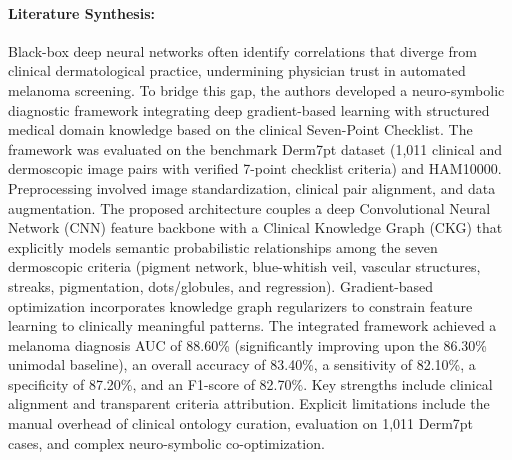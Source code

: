\paragraph{Literature Synthesis:} Black-box deep neural networks often identify correlations that diverge from clinical dermatological practice, undermining physician trust in automated melanoma screening. To bridge this gap, the authors developed a neuro-symbolic diagnostic framework integrating deep gradient-based learning with structured medical domain knowledge based on the clinical Seven-Point Checklist. The framework was evaluated on the benchmark Derm7pt dataset (1,011 clinical and dermoscopic image pairs with verified 7-point checklist criteria) and HAM10000. Preprocessing involved image standardization, clinical pair alignment, and data augmentation. The proposed architecture couples a deep Convolutional Neural Network (CNN) feature backbone with a Clinical Knowledge Graph (CKG) that explicitly models semantic probabilistic relationships among the seven dermoscopic criteria (pigment network, blue-whitish veil, vascular structures, streaks, pigmentation, dots/globules, and regression). Gradient-based optimization incorporates knowledge graph regularizers to constrain feature learning to clinically meaningful patterns. The integrated framework achieved a melanoma diagnosis AUC of 88.60\% (significantly improving upon the 86.30\% unimodal baseline), an overall accuracy of 83.40\%, a sensitivity of 82.10\%, a specificity of 87.20\%, and an F1-score of 82.70\%. Key strengths include clinical alignment and transparent criteria attribution. Explicit limitations include the manual overhead of clinical ontology curation, evaluation on 1,011 Derm7pt cases, and complex neuro-symbolic co-optimization.

